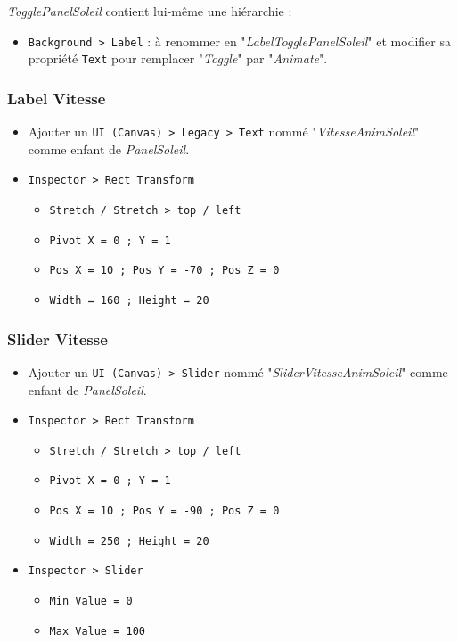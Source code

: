 \documentclass[a4paper,10pt]{article}
\newenvironment{solution}%
{\begin{tcolorbox}[breakable,colback=red!5!white,colframe=red!75!black,title=Solution]}%
{\end{tcolorbox}}
\begin{document}
\begin{solution}
\textit{TogglePanelSoleil} contient lui-même une hiérarchie : 
\begin{itemize}
	\item  \texttt{Background > Label} : à renommer en "\textit{LabelTogglePanelSoleil}" et modifier sa propriété \texttt{Text} pour remplacer "\textit{Toggle}" par "\textit{Animate}".
	\end{itemize}

\subsubsection{Label Vitesse}
\begin{itemize}
	\item Ajouter un \texttt{UI (Canvas) > Legacy > Text} nommé "\textit{VitesseAnimSoleil}" comme enfant de \textit{PanelSoleil}.
	\item \texttt{Inspector > Rect Transform}
	\begin{itemize}
		\item \texttt{Stretch / Stretch > top / left}
		\item \texttt{Pivot X = 0 ; Y = 1}
		\item \texttt{Pos X = 10 ; Pos Y = -70 ; Pos Z = 0}
		\item \texttt{Width = 160 ; Height = 20}	
	\end{itemize}
\end{itemize}

\subsubsection{Slider Vitesse}
\begin{itemize}
	\item Ajouter un \texttt{UI (Canvas) > Slider} nommé "\textit{SliderVitesseAnimSoleil}" comme enfant de \textit{PanelSoleil}.
	\item \texttt{Inspector > Rect Transform}
	\begin{itemize}
		\item \texttt{Stretch / Stretch > top / left}
		\item \texttt{Pivot X = 0 ; Y = 1}
		\item \texttt{Pos X = 10 ; Pos Y = -90 ; Pos Z = 0}
		\item \texttt{Width = 250 ; Height = 20}	
	\end{itemize}
\item \texttt{Inspector > Slider}
\begin{itemize}
	\item \texttt{Min Value = 0}
	\item \texttt{Max Value = 100}
\end{itemize}
\end{itemize}


\end{solution}
\end{document}
